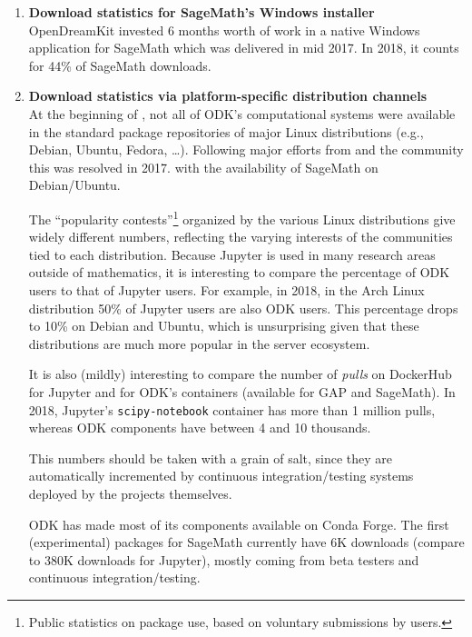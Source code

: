 \begin{enumerate}
\item \textbf{Download statistics for SageMath's Windows installer}\\
  OpenDreamKit invested 6 months worth of work in a native Windows
  application for SageMath which was delivered in mid 2017. In 2018,
  it counts for 44\% of SageMath downloads.


\item \textbf{Download statistics via platform-specific distribution
    channels}\\
  At the beginning of \ODK, not all of ODK's computational systems
  were available in the standard package repositories of major Linux
  distributions (e.g., Debian, Ubuntu, Fedora, \dots). Following major
  efforts from \ODK and the community this was resolved in 2017. with
  the availability of SageMath on Debian/Ubuntu.

  \noindent
  The ``popularity contests''\footnote{Public statistics on package
    use, based on voluntary submissions by users.} organized by the
  various Linux distributions give widely different numbers,
  reflecting the varying interests of the communities tied to each
  distribution. Because Jupyter is used in many research areas outside
  of mathematics, it is interesting to compare the percentage of ODK
  users to that of Jupyter users. For example, in 2018, in the Arch
  Linux distribution 50\% of Jupyter users are also ODK users. This
  percentage drops to 10\% on Debian and Ubuntu, which is unsurprising
  given that these distributions are much more popular in the server
  ecosystem.

  \noindent
  It is also (mildly) interesting to compare the number of
  \emph{pulls} on DockerHub for Jupyter and for ODK's containers
  (available for GAP and SageMath). In 2018, Jupyter's
  \texttt{scipy-notebook} container has more than 1 million pulls,
  whereas ODK components have between 4 and 10 thousands.

  \noindent
  This numbers should be taken with a grain of salt, since they are
  automatically incremented by continuous integration/testing systems
  deployed by the projects themselves.

  \noindent
  ODK has made most of its components available on Conda Forge. The first
  (experimental) packages for SageMath currently have 6K downloads
  (compare to 380K downloads for Jupyter), mostly coming from beta
  testers and continuous integration/testing.
\end{enumerate}


